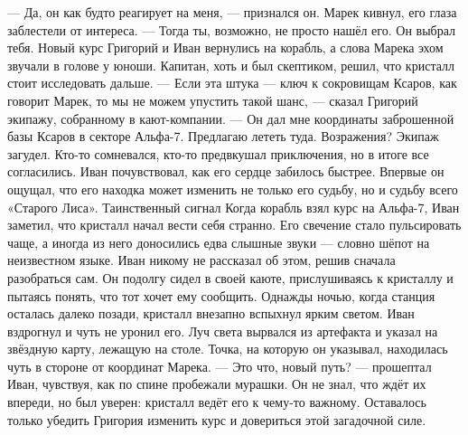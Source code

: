 \documentclass[12pt,a4paper]{book}
\begin{document}
— Да, он как будто реагирует на меня, — признался он.
Марек кивнул, его глаза заблестели от интереса.
— Тогда ты, возможно, не просто нашёл его. Он выбрал тебя.
Новый курс
Григорий и Иван вернулись на корабль, а слова Марека эхом звучали в голове у юноши. Капитан, хоть и был скептиком, решил, что кристалл стоит исследовать дальше.
— Если эта штука — ключ к сокровищам Ксаров, как говорит Марек, то мы не можем упустить такой шанс, — сказал Григорий экипажу, собранному в кают-компании. — Он дал мне координаты заброшенной базы Ксаров в секторе Альфа-7. Предлагаю лететь туда. Возражения?
Экипаж загудел. Кто-то сомневался, кто-то предвкушал приключения, но в итоге все согласились. Иван почувствовал, как его сердце забилось быстрее. Впервые он ощущал, что его находка может изменить не только его судьбу, но и судьбу всего «Старого Лиса».
Таинственный сигнал
Когда корабль взял курс на Альфа-7, Иван заметил, что кристалл начал вести себя странно. Его свечение стало пульсировать чаще, а иногда из него доносились едва слышные звуки — словно шёпот на неизвестном языке. Иван никому не рассказал об этом, решив сначала разобраться сам. Он подолгу сидел в своей каюте, прислушиваясь к кристаллу и пытаясь понять, что тот хочет ему сообщить.
Однажды ночью, когда станция осталась далеко позади, кристалл внезапно вспыхнул ярким светом. Иван вздрогнул и чуть не уронил его. Луч света вырвался из артефакта и указал на звёздную карту, лежащую на столе. Точка, на которую он указывал, находилась чуть в стороне от координат Марека.
— Это что, новый путь? — прошептал Иван, чувствуя, как по спине пробежали мурашки.
Он не знал, что ждёт их впереди, но был уверен: кристалл ведёт его к чему-то важному. Оставалось только убедить Григория изменить курс и довериться этой загадочной силе.
\end{document}
